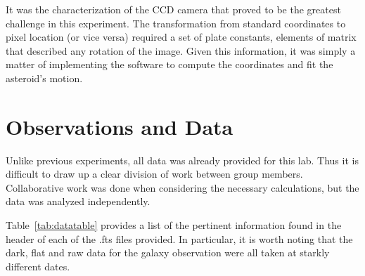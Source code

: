 \documentclass[a4paper,12pt]{article}
\begin{document}
It was the characterization of the CCD camera that proved to be the greatest challenge in this experiment. The transformation from standard coordinates to pixel location (or vice versa) required a set of plate constants, elements of matrix that described any rotation of the image. Given this information, it was simply a matter of implementing the software to compute the coordinates and fit the asteroid's motion.


\section{Observations and Data}
\label{sec:obs}

Unlike previous experiments, all data was already provided for this lab. Thus it is difficult to draw up a clear division of work between group members. Collaborative work was done when considering the necessary calculations, but the data was analyzed independently.

Table~\ref{tab:datatable} provides a list of the pertinent information found in the header of each of the .fts files provided. In particular, it is worth noting that the dark, flat and raw data for the galaxy observation were all taken at starkly different dates.
\end{document}
